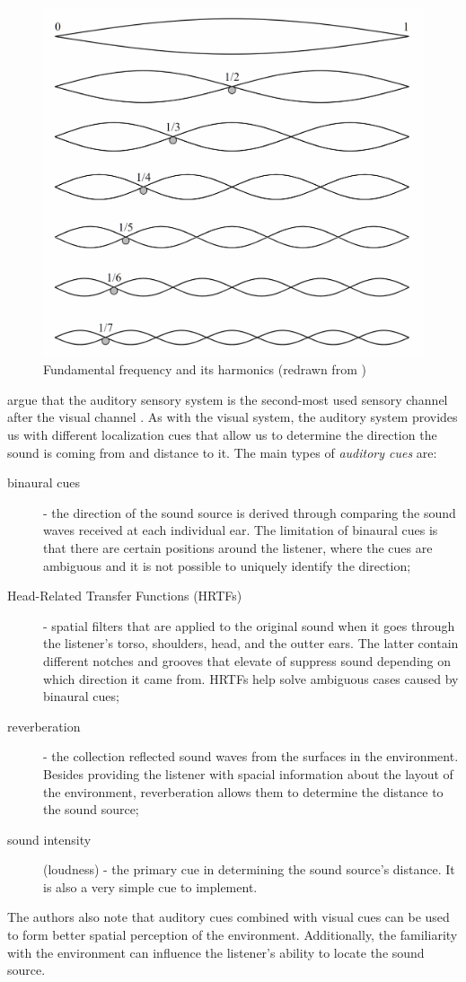 \begin{figure}
	\centering
	\includegraphics[width=0.7\linewidth]{figures/placeholders/fundamental_frequency_and_harmonics}
	\caption{Fundamental frequency and its harmonics (redrawn from \parencite{noauthor_fundamental_nodate})}
	\label{fig:fundamentalfrequencyandharmonics}
\end{figure}

\parencite[p.~46]{jr_3d_2017} argue that the auditory sensory system is the second-most used sensory channel after the visual channel . As with the visual system, the auditory system provides us with different localization cues that allow us to determine the direction the sound is coming from and distance to it. The main types of \textit{auditory cues }are:
\begin{description}
	\item[binaural cues] - the direction of the sound source is derived through comparing the sound waves received at each individual ear. The limitation of binaural cues is that there are certain positions around the listener, where the cues are ambiguous and it is not possible to uniquely identify the direction;
	\item[Head-Related Transfer Functions (HRTFs)] - spatial filters that are applied to the original sound when it goes through the listener's torso, shoulders, head, and the outter ears. The latter contain different notches and grooves that elevate of suppress sound depending on which direction it came from. HRTFs help solve ambiguous cases caused by binaural cues;
	\item[reverberation] - the collection reflected sound waves from the surfaces in the environment. Besides providing the listener with spacial information about the layout of the environment, reverberation allows them to determine the distance to the sound source;
	\item[sound intensity] (loudness) - the primary cue in determining the sound source's distance. It is also a very simple cue to implement.
\end{description}
The authors also note that auditory cues combined with visual cues can be used to form better spatial perception of the environment. Additionally, the familiarity with the environment can influence the listener's ability to locate the sound source.

